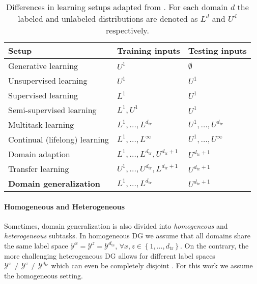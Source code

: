 \begin{table}[t]
    \centering
    \begin{tabular}{lll}
    \toprule
    \textbf{Setup} & \textbf{Training inputs}  & \textbf{Testing inputs} \\
    \midrule
        Generative learning & $U^1$ & $\emptyset$ \\ 
        Unsupervised learning & $U^1$ & $U^1$  \\ 
        Supervised learning & $L^1$ & $U^1$ \\ 
        Semi-supervised learning & $L^{1}, U^{1}$ & $U^1$ \\ 
        Multitask learning & $L^{1}, \ldots, L^{d_{\mathrm{tr}}}$ & $U^{1}, \ldots, U^{d_{\mathrm{tr}}}$ \\ 
        Continual (lifelong) learning & $L^{1}, \ldots, L^{\infty}$ & $U^{1}, \ldots, U^{\infty}$ \\ 
        Domain adaption & $L^{1}, \ldots, L^{d_{\mathrm{tr}}}, U^{d_{\mathrm{tr}}+1}$ & $U^{d_{\mathrm{tr}}+1}$ \\ 
        Transfer learning & $U^{1}, \ldots, U^{d_{\mathrm{tr}}}, L^{d_{\mathrm{tr}}+1}$ & $U^{d_{\mathrm{tr}}+1}$ \\ 
        \textbf{Domain generalization} & $L^{1}, \ldots, L^{d_{\mathrm{tr}}}$ & $U^{d_{\mathrm{tr}}+1}$ \\ 
    \bottomrule
    \end{tabular}
    \caption[Differences in learning setups]{Differences in learning setups adapted from \citet{gulrajani2020search}. For each domain $d$ the labeled and unlabeled distributions are denoted as $L^d$ and $U^d$ respectively.}
    \label{tab:learning_setups}
\end{table}

\paragraph{Homogeneous and Heterogeneous}
Sometimes, domain generalization is also divided into \emph{homogeneous} and \emph{heterogeneous} subtasks. In homogeneous DG we assume that all domains share the same label space $\mathcal{Y}^x = \mathcal{Y}^z = \mathcal{Y}^{d_\mathrm{te}}$, $\forall x, z \in \left\{1, \ldots, d_{\mathrm{tr}}\right\}$. On the contrary, the more challenging heterogeneous DG allows for different label spaces $\mathcal{Y}^x \neq \mathcal{Y}^z \neq \mathcal{Y}^{d_\mathrm{te}}$ which can even be completely disjoint \citep{LiZYLSH19}. For this work we assume the homogeneous setting.

